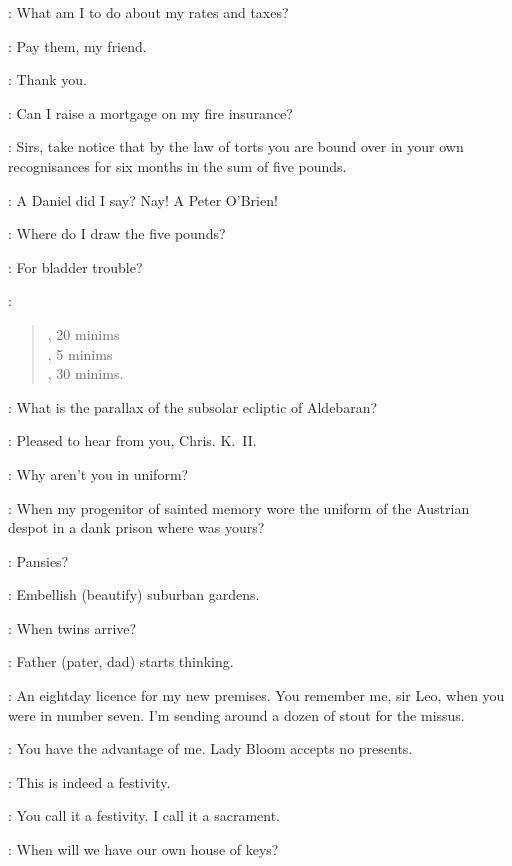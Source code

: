 \PaddyLeonard:
What am I to do about my rates and taxes?

\Bloom:
Pay them, my friend.

\PaddyLeonard:
Thank you.

\NoseyFlynn:
Can I raise a mortgage on my fire insurance?%

\Bloom:
Sirs, take notice that by the law of torts you are bound over
in your own recognisances for six months in the sum of five pounds.

\JJOM:
A Daniel did I say?
Nay! A Peter O'Brien!

\NoseyFlynn:
Where do I draw the five pounds?

\PisserBurke:
For bladder trouble?

\Bloom:
\begin{verse}
, 20 minims\\
, 5 minims\\
, 30 minims.\\
\end{verse}

\ChrisCallinan:
What is the parallax of the subsolar ecliptic of Aldebaran?

\Bloom:
Pleased to hear from you, Chris. K.~II.

\JoeHynes:
Why aren't you in uniform?%

\Bloom:
When my progenitor of sainted memory
wore the uniform of the Austrian despot in a dank prison
where was yours?

\BenDollard:
Pansies?

\Bloom:
Embellish (beautify) suburban gardens.

\BenDollard:
When twins arrive?

\Bloom:
Father (pater, dad) starts thinking.

\LarryORourke:
An eightday licence for my new premises.
You remember me, sir Leo, when you were in number seven.
I'm sending around a dozen of stout for the missus.

\Bloom:
You have the advantage of me.
Lady Bloom accepts no presents.

\Crofton:
This is indeed a festivity.

\Bloom:
You call it a festivity.
I call it a sacrament.

\AlexanderKeyes:
When will we have our own house of keys?

